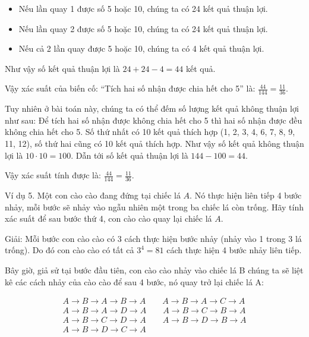 \documentclass[%
    fontsize=12pt,%
    chapterprefix=false,%
    open=right,%
    twoside=false,%
    numbers=noenddot,%
    headings=optiontohead,%
    final,%
    DIV=15,%
    parskip=half %
]{scrbook}
\begin{document}
\begin{itemize}
  \item Nếu lần quay 1 được số 5 hoặc 10, chúng ta có 24 kết quả thuận lợi.
  \item Nếu lần quay 2 được số 5 hoặc 10, chúng ta có 24 kết quả thuận lợi.
  \item Nếu cả 2 lần quay được 5 hoặc 10, chúng ta có 4 kết quả thuận lợi.
\end{itemize}

Như vậy số kết quả thuận lợi là $24 + 24 - 4 = 44$ kết quả.

Vậy xác suất của biến cố: ``Tích hai số nhận được chia hết cho 5'' là: $\frac{44}{144} = \frac{11}{36}$.

Tuy nhiên ở bài toán này, chúng ta có thể đếm số lượng kết quả không thuận lợi như sau: Để tích hai số nhận được không chia hết cho 5 thì hai số nhận được đều không chia hết cho 5. Số thứ nhất có 10 kết quả thích hợp (1, 2, 3, 4, 6, 7, 8, 9, 11, 12), số thứ hai cũng có 10 kết quả thích hợp. Như vậy số kết quả không thuận lợi là $10 \cdot 10 = 100$. Dẫn tới số kết quả thuận lợi là $144 - 100 = 44$.

Vậy xác suất tính được là: $\frac{44}{144} = \frac{11}{36}$.

Ví dụ 5. Một con cào cào đang đứng tại chiếc lá $A$. Nó thực hiện liên tiếp 4 bước nhảy, mỗi bước sẽ nhảy vào ngẫu nhiên một trong ba chiếc lá còn trống. Hãy tính xác suất để sau bước thứ 4, con cào cào quay lại chiếc lá $A$.


Giải: Mỗi bước con cào cào có 3 cách thực hiện bước nhảy (nhảy vào 1 trong 3 lá trống). Do đó con cào cào có tất cả $3^4 = 81$ cách thực hiện 4 bước nhảy liên tiếp.

Bây giờ, giả sử tại bước đầu tiên, con cào cào nhảy vào chiếc lá B chúng ta sẽ liệt kê các cách nhảy của cào cào để sau 4 bước, nó quay trở lại chiếc lá A:

\begin{align*}
A \rightarrow B \rightarrow A \rightarrow B \rightarrow A \qquad A \rightarrow B \rightarrow A \rightarrow C \rightarrow A \\
A \rightarrow B \rightarrow A \rightarrow D \rightarrow A \qquad A \rightarrow B \rightarrow C \rightarrow B \rightarrow A \\
A \rightarrow B \rightarrow C \rightarrow D \rightarrow A \qquad A \rightarrow B \rightarrow D \rightarrow B \rightarrow A \\
A \rightarrow B \rightarrow D \rightarrow C \rightarrow A
\end{align*}
\end{document}
